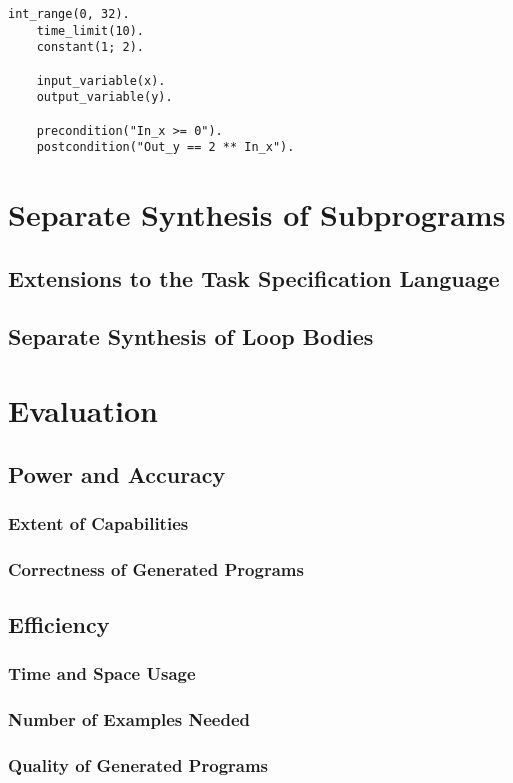 \documentclass[a4paper,twoside,notitlepage]{report}
\begin{document}
\begin{Verbatim}[samepage=true]
    int_range(0, 32).
    time_limit(10).
    constant(1; 2).    

    input_variable(x).
    output_variable(y).

    precondition("In_x >= 0").
    postcondition("Out_y == 2 ** In_x").
\end{Verbatim}

\chapter{Separate Synthesis of Subprograms} \label{chp:gensub}

\section{Extensions to the Task Specification Language}

\section{Separate Synthesis of Loop Bodies}

\chapter{Evaluation}
\section{Power and Accuracy}
\subsection{Extent of Capabilities}
\subsection{Correctness of Generated Programs}
\section{Efficiency}
\subsection{Time and Space Usage}
\subsection{Number of Examples Needed}
\subsection{Quality of Generated Programs}
\end{document}

